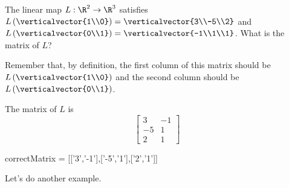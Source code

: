 \documentclass{ximera}
\begin{document}
\begin{question}
  The linear map $L:\R^2\to\R^3$ satisfies
  $L\left(\verticalvector{1\\0}\right) = \verticalvector{3\\-5\\2}$ and
  $L\left(\verticalvector{0\\1}\right) = \verticalvector{-1\\1\\1}$.  What is the
  matrix of $L$?

  \begin{solution}
  	\begin{hint}
  		Remember that, by definition, the first column of this matrix should be $L\left(\verticalvector{1\\0}\right)$ and
  		the second column should be $L\left( \verticalvector{0\\1}\right)$.
  	\end{hint}
  	\begin{hint}
  		The matrix of $L$ is 
  		\[
  			\begin{bmatrix}
  				3&-1\\
  				-5&1\\
  				2&1
  			\end{bmatrix}
  			\]
  	\end{hint}
    \begin{matrix-answer}[name=L]
      correctMatrix = [['3','-1'],['-5','1'],['2','1']]
    \end{matrix-answer}    
  \end{solution}
\end{question}

Let's do another example.
\end{document}
